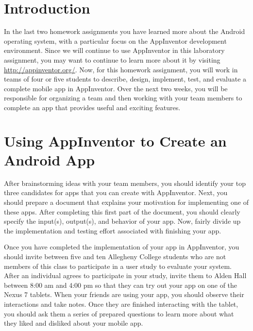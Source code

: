 

\usepackage[compact]{titlesec}



\section*{Introduction}

In the last two homework assignments you have learned more about the Android operating system, with a particular focus
on the AppInventor development environment. Since we will continue to use AppInventor in this laboratory assignment, you
may want to continue to learn more about it by visiting \url{http://appinventor.org/}.  Now, for this homework
assignment, you will work in teams of four or five students to describe, design, implement, test, and evaluate a
complete mobile app in AppInventor.  Over the next two weeks, you will be responsible for organizing a team and then
working with your team members to complete an app that provides useful and exciting features.

\section*{Using AppInventor to Create an Android App}

After brainstorming ideas with your team members, you should identify your top three candidates for apps that you can
create with AppInventor.  Next, you should prepare a document that explains your motivation for implementing one
of these apps.  After completing this first part of the document, you should clearly specify the input(s), output(s),
and behavior of your app. Now, fairly divide up the implementation and testing effort associated with finishing your
app. 

Once you have completed the implementation of your app in AppInventor, you should invite between five and ten Allegheny
College students who are not members of this class to participate in a user study to evaluate your system.  After an
individual agrees to participate in your study, invite them to Alden Hall between 8:00 am and 4:00 pm so that they can
try out your app on one of the Nexus 7 tablets. When your friends are using your app, you should observe their
interactions and take notes.  Once they are finished interacting with the tablet, you should ask them a series of
prepared questions to learn more about what they liked and disliked about your mobile app.  

